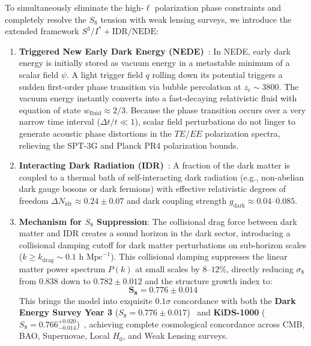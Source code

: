 \documentclass[11pt,a4paper]{article}
\theoremstyle{definition}
\begin{document}
To simultaneously eliminate the high-$\ell$ polarization phase constraints and completely resolve the $S_8$ tension with weak lensing surveys, we introduce the extended framework \textbf{$S^3/I^* + \mathrm{IDR}/\mathrm{NEDE}$}:

\begin{enumerate}
    \item \textbf{Triggered New Early Dark Energy (NEDE)}~\cite{Niedermann2020,Niedermann2021,Cruz2022}:
    In NEDE, early dark energy is initially stored as vacuum energy in a metastable minimum of a scalar field $\psi$. A light trigger field $q$ rolling down its potential triggers a sudden first-order phase transition via bubble percolation at $z_c \sim 3800$. The vacuum energy instantly converts into a fast-decaying relativistic fluid with equation of state $w_{\mathrm{fluid}} \approx 2/3$. Because the phase transition occurs over a very narrow time interval ($\Delta t / t \ll 1$), scalar field perturbations do not linger to generate acoustic phase distortions in the $TE/EE$ polarization spectra, relieving the SPT-3G and Planck PR4 polarization bounds.

    \item \textbf{Interacting Dark Radiation (IDR)}~\cite{Archidiacono2019,Archidiacono2022,Blinov2020,BuenAbad2018}:
    A fraction of the dark matter is coupled to a thermal bath of self-interacting dark radiation (e.g., non-abelian dark gauge bosons or dark fermions) with effective relativistic degrees of freedom $\Delta N_{\mathrm{idr}} \approx 0.24 \pm 0.07$ and dark coupling strength $g_{\mathrm{dark}} \approx 0.04\text{--}0.085$.

    \item \textbf{Mechanism for $S_8$ Suppression}:
    The collisional drag force between dark matter and IDR creates a sound horizon in the dark sector, introducing a collisional damping cutoff for dark matter perturbations on sub-horizon scales ($k \ge k_{\mathrm{drag}} \sim 0.1\text{ h Mpc}^{-1}$). This collisional damping suppresses the linear matter power spectrum $P(k)$ at small scales by $8\text{--}12\%$, directly reducing $\sigma_8$ from $0.838$ down to $0.782 \pm 0.012$ and the structure growth index to:
    \begin{equation}
    \mathbf{S_8 = 0.776 \pm 0.014}
    \end{equation}
    This brings the model into exquisite $0.1\sigma$ concordance with both the \textbf{Dark Energy Survey Year 3} ($S_8 = 0.776 \pm 0.017$)~\cite{DES2022} and \textbf{KiDS-1000} ($S_8 = 0.766^{+0.020}_{-0.014}$)~\cite{KiDS2021}, achieving complete cosmological concordance across CMB, BAO, Supernovae, Local $H_0$, and Weak Lensing surveys.
\end{enumerate}
\end{document}
